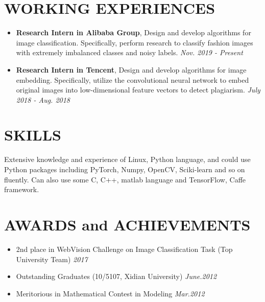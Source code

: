 \documentclass[11pt,a4paper,palatine]{moderncv}        %
\begin{document}
\begin{CJK*}{UTF8}{gbsn}
\section{WORKING EXPERIENCES}
\begin{itemize}
    \item \textbf{Research Intern in Alibaba Group}, Design and develop algorithms for image classification. Specifically, perform research to classify fashion images with extremely imbalanced classes and noisy labels. \hfill {\itshape Nov. 2019 - Present}
    \item \textbf{Research Intern in Tencent}, 	Design and develop algorithms for image embedding. Specifically, utilize the convolutional neural network to embed original images into low-dimensional feature vectors to detect plagiarism. \hfill {\itshape July 2018 - Aug. 2018}
\end{itemize}

\section{SKILLS}
    Extensive knowledge and experience of Linux, Python language, and could use Python packages including PyTorch, Numpy, OpenCV, Sciki-learn and so on fluently. Can also use some C, C++, matlab language and TensorFlow, Caffe framework.

\section{AWARDS and ACHIEVEMENTS}
	\begin{itemize}
      \item 2nd place in WebVision Challenge on Image Classification Task (Top University Team) \hfill {\itshape 2017}
      \item Outstanding Graduates (10/5107, Xidian University) \hfill {\itshape June.2012}
      \item Meritorious in Mathematical Contest in Modeling \hfill {\itshape Mar.2012}
	\end{itemize}%


\end{CJK*}
\end{document}
